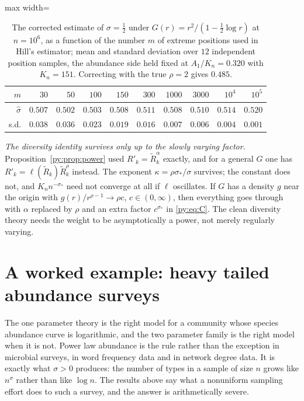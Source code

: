 \begin{table}[t]
\centering
\caption{The corrected estimate of $\sigma = \tfrac12$ under $G(r) = r^{2}/(1-\tfrac12\log r)$ at
$n = 10^{6}$, as a function of the number $m$ of extreme positions used in Hill's estimator; mean
and standard deviation over $12$ independent position samples, the abundance side held fixed at
$A_1/K_n = 0.320$ with $K_n = 151$. Correcting with the true $\rho = 2$ gives $0.485$.}
\label{py:tab:scale}
\begin{adjustbox}{max width=\textwidth}
\begin{tabular}{rrrrrrrrrr}
\toprule
$m$ & $30$ & $50$ & $100$ & $150$ & $300$ & $1000$ & $3000$ & $10^{4}$ & $10^{5}$\\
\midrule
$\hat\sigma$ & $0.507$ & $0.502$ & $0.503$ & $0.508$ & $0.511$ & $0.508$ & $0.510$ & $0.514$ & $0.520$\\
s.d. & $0.038$ & $0.036$ & $0.023$ & $0.019$ & $0.016$ & $0.007$ & $0.006$ & $0.004$ & $0.001$\\
\bottomrule
\end{tabular}
\end{adjustbox}
\end{table}


\emph{The diversity identity survives only up to the slowly varying factor.}
Proposition~\ref{py:prop:power} used $R'_k = \widetilde R_k^{\alpha}$ exactly, and for a general $G$
one has $R'_k = \ell(\widetilde R_k)\widetilde R_k^{\rho}$ instead. The exponent
$\kappa = \rho\sigma_*/\sigma$ survives; the constant does not, and $K_n n^{-\sigma_*}$ need not
converge at all if $\ell$ oscillates. If $G$ has a density $g$ near the origin with $g(r)/r^{\rho-1} \to \rho c$, $c \in (0,\infty)$, then everything goes
through with $\alpha$ replaced by $\rho$ and an extra factor $c^{\sigma_*}$ in \eqref{py:eq:C}. The
clean diversity theory needs the weight to be asymptotically a power, not merely regularly varying.

\section{A worked example: heavy tailed abundance surveys}
\label{py:sec:example}

The one parameter theory is the right model for a community whose species abundance curve is
logarithmic, and the two parameter family is the right model when it is not. Power law abundance
is the rule rather than the exception in microbial surveys, in word frequency data and in network
degree data. It is exactly what $\sigma > 0$ produces: the number of types in a sample of size $n$
grows like $n^{\sigma}$ rather than like $\log n$. The results above say what
a nonuniform sampling effort does to such a survey, and the answer is arithmetically severe.

